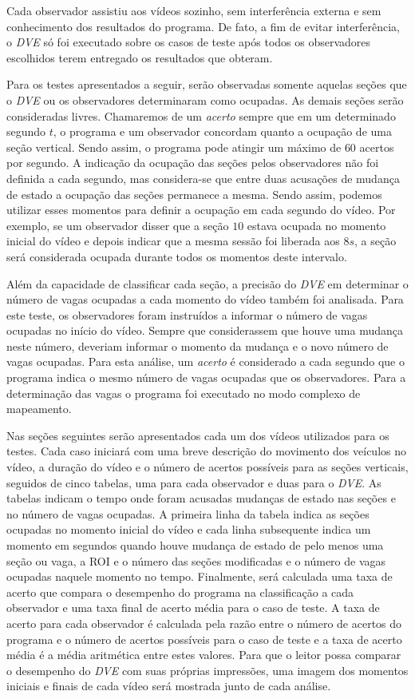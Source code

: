 Cada observador assistiu aos vídeos sozinho, sem interferência externa e sem conhecimento dos resultados do programa. De fato, a fim de evitar interferência, o \textit{DVE} só foi executado sobre os casos de teste após todos os observadores escolhidos terem entregado os resultados que obteram.

Para os testes apresentados a seguir, serão observadas somente aquelas seções que o \textit{DVE} ou os observadores determinaram como ocupadas. As demais seções serão consideradas livres. Chamaremos de um \textit{acerto} sempre que em um determinado segundo $t$, o programa e um observador concordam quanto a ocupação de uma seção vertical. Sendo assim, o programa pode atingir um máximo de $60$ acertos por segundo. A indicação da ocupação das seções pelos observadores não foi definida a cada segundo, mas considera-se que entre duas acusações de mudança de estado a ocupação das seções permanece a mesma. Sendo assim, podemos utilizar esses momentos para definir a ocupação em cada segundo do vídeo. Por exemplo, se um observador disser que a seção $10$ estava ocupada no momento inicial do vídeo e depois indicar que a mesma sessão foi liberada aos $8s$, a seção será considerada ocupada durante todos os momentos deste intervalo. 

Além da capacidade de classificar cada seção, a precisão do \textit{DVE} em determinar o número de vagas ocupadas a cada momento do vídeo também foi analisada. Para este teste, os observadores foram instruídos a informar o número de vagas ocupadas no início do vídeo. Sempre que considerassem que houve uma mudança neste número, deveriam informar o momento da mudança e o novo número de vagas ocupadas. Para esta análise, um \textit{acerto} é considerado a cada segundo que o programa indica o mesmo número de vagas ocupadas que os observadores. Para a determinação das vagas o programa foi executado no modo complexo de mapeamento.

Nas seções seguintes serão apresentados cada um dos vídeos utilizados para os testes. Cada caso iniciará com uma breve descrição do movimento dos veículos no vídeo, a duração do vídeo e o número de acertos possíveis para as seções verticais, seguidos de cinco tabelas, uma para cada observador e duas para o \textit{DVE}. As tabelas indicam o tempo onde foram acusadas mudanças de estado nas seções e no número de vagas ocupadas. A primeira linha da tabela indica as seções ocupadas no momento inicial do vídeo e cada linha subsequente indica um momento em segundos quando houve mudança de estado de pelo menos uma seção ou vaga, a ROI e o número das seções modificadas e o número de vagas ocupadas naquele momento no tempo.  Finalmente, será calculada uma taxa de acerto que compara o desempenho do programa na classificação a cada observador e uma taxa final de acerto média para o caso de teste. A taxa de acerto para cada observador é calculada pela razão entre o número de acertos do programa e o número de acertos possíveis para o caso de teste e a taxa de acerto média é a média aritmética entre estes valores. Para que o leitor possa comparar o desempenho do \textit{DVE} com suas próprias impressões, uma imagem dos momentos iniciais e finais de cada vídeo será mostrada junto de cada análise.

